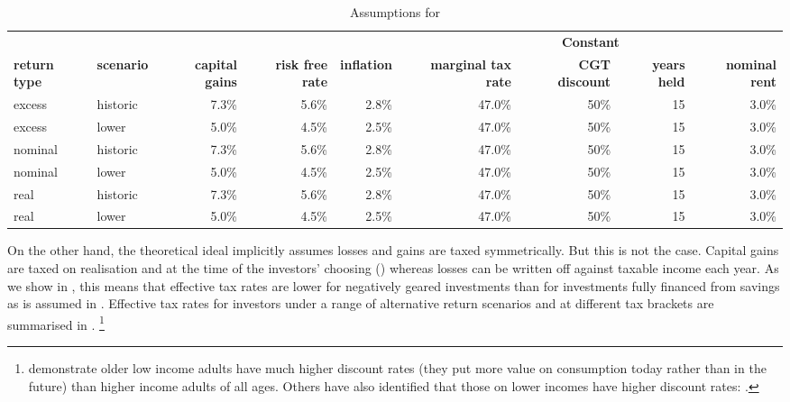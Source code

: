 \begin{table}
\centering
\captionsetup{justification=centering}
\caption{Assumptions for }\label{tbl:EMTR-savings-assumptions}
\small
\begin{tabular}{llrrrrrrr}
  \toprule
   &  &  &  &  & \multicolumn{4}{c}{\textbf{Constant}}\\
 \cmidrule(lr){6-9}
 \textbf{return type} & \textbf{scenario} & \textbf{capital gains} & \textbf{risk free rate} & \textbf{inflation} & \textbf{marginal tax rate} & \textbf{CGT discount} & \textbf{years held} & \textbf{nominal rent}\\
 \midrule
excess & historic & 7.3\% & 5.6\% & 2.8\% & 47.0\% & 50\% & 15 & 3.0\% \\ 
  excess & lower & 5.0\% & 4.5\% & 2.5\% & 47.0\% & 50\% & 15 & 3.0\% \\[4pt] 
  nominal & historic & 7.3\% & 5.6\% & 2.8\% & 47.0\% & 50\% & 15 & 3.0\% \\ 
  nominal & lower & 5.0\% & 4.5\% & 2.5\% & 47.0\% & 50\% & 15 & 3.0\% \\[4pt] 
  real & historic & 7.3\% & 5.6\% & 2.8\% & 47.0\% & 50\% & 15 & 3.0\% \\ 
  real & lower & 5.0\% & 4.5\% & 2.5\% & 47.0\% & 50\% & 15 & 3.0\% \\ 
   \bottomrule
\end{tabular}

\end{table}
On the other hand, the theoretical ideal implicitly assumes losses and gains are taxed symmetrically. But this is not the case. Capital gains are taxed on realisation and at the time of the investors’ choosing () whereas losses can be written off against taxable income each year. As we show in , this means that effective tax rates are lower for negatively geared investments than for investments fully financed from savings as is assumed in . Effective tax rates for investors under a range of alternative return scenarios and at different tax brackets are summarised in .%
\footnote{\textcite{GreenMyersonLichtmanEtAl1996} demonstrate older low income adults have much higher discount rates (\ie they put more value on consumption today rather than in the future) than higher income adults of all ages. Others have also identified that those on lower incomes have higher discount rates:  \textcites{ReimersMaylorStewartEtAl2009}{HarrisonLauWilliams2002}.}

